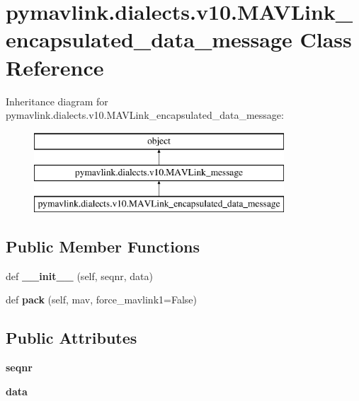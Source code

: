 \hypertarget{classpymavlink_1_1dialects_1_1v10_1_1MAVLink__encapsulated__data__message}{}\section{pymavlink.\+dialects.\+v10.\+M\+A\+V\+Link\+\_\+encapsulated\+\_\+data\+\_\+message Class Reference}
\label{classpymavlink_1_1dialects_1_1v10_1_1MAVLink__encapsulated__data__message}
Inheritance diagram for pymavlink.\+dialects.\+v10.\+M\+A\+V\+Link\+\_\+encapsulated\+\_\+data\+\_\+message\+:\begin{figure}[H]
\begin{center}
\leavevmode
\includegraphics[height=3.000000cm]{classpymavlink_1_1dialects_1_1v10_1_1MAVLink__encapsulated__data__message}
\end{center}
\end{figure}
\subsection*{Public Member Functions}
\begin{DoxyCompactItemize}
\item 
\mbox{\label{classpymavlink_1_1dialects_1_1v10_1_1MAVLink__encapsulated__data__message_a592c0249b9756455dfe3789fade929c3}} 
def {\bfseries \+\_\+\+\_\+init\+\_\+\+\_\+} (self, seqnr, data)
\item 
\mbox{\label{classpymavlink_1_1dialects_1_1v10_1_1MAVLink__encapsulated__data__message_a3c0a1cce0f210a053c37403e7af52313}} 
def {\bfseries pack} (self, mav, force\+\_\+mavlink1=False)
\end{DoxyCompactItemize}
\subsection*{Public Attributes}
\begin{DoxyCompactItemize}
\item 
\mbox{\label{classpymavlink_1_1dialects_1_1v10_1_1MAVLink__encapsulated__data__message_a2b64ea5ebef9c8a1cd745b8824417c2c}} 
{\bfseries seqnr}
\item 
\mbox{\label{classpymavlink_1_1dialects_1_1v10_1_1MAVLink__encapsulated__data__message_af369619b14cd7e084178ef9b9d011338}} 
{\bfseries data}
\end{DoxyCompactItemize}
